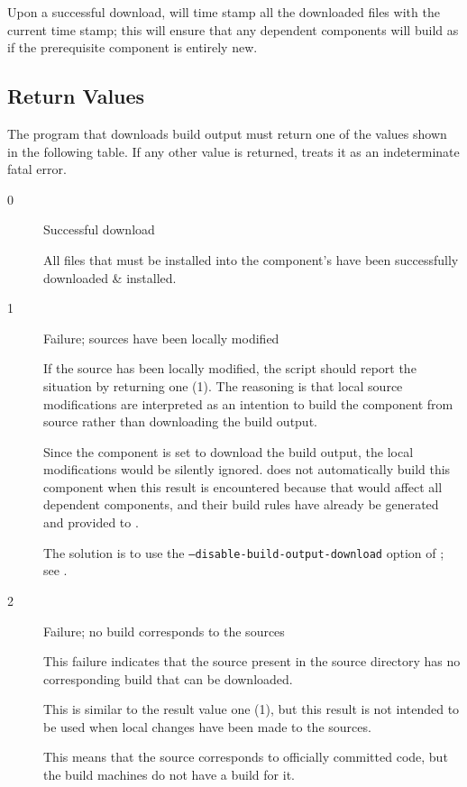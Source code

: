 Upon a successful download, \lmsbw will time stamp all the downloaded
files with the current time stamp; this will ensure that any dependent
components will build as if the prerequisite component is entirely
new.

\subsection{Return Values}
The program that downloads build output must return one of the
values shown in the following table.  If any other value is returned,
\lmsbw treats it as an indeterminate fatal error.


\begin{description}
\item[0]{Successful download}

  All files that must be installed into the component's \destdir have
  been successfully downloaded \& installed.

\item[1]{Failure; sources have been locally modified}

  If the source has been locally modified, the script should report
  the situation by returning one (1).  The reasoning is that local
  source modifications are interpreted as an intention to build the
  component from source rather than downloading the build output.

  Since the component is set to download the build output, the local
  modifications would be silently ignored.  \lmsbw does not
  automatically build this component when this result is encountered
  because that would affect all dependent components, and their build
  rules have already be generated and provided to \make.

  The solution is to use the \texttt{--disable-build-output-download}
  option of \lmsbwcmd; see .

\item[2]{Failure; no build corresponds to the sources}

  This failure indicates that the source present in the source
  directory has no corresponding build that can be downloaded.

  This is similar to the result value one (1), but this result is not
  intended to be used when local changes have been made to the
  sources.

  This means that the source corresponds to officially committed code,
  but the build machines do not have a build for it.


\end{description}
